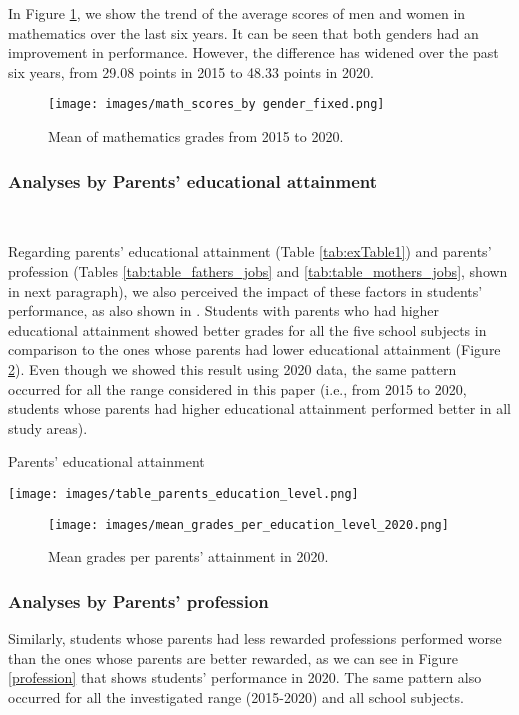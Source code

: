 \documentclass[12pt]{article}
\begin{document}
In Figure \ref{math_scores}, we show the trend of the average scores of men and women in mathematics over the last six years. It can be seen that both genders had an improvement in performance. However, the difference has widened over the past six years, from  29.08 points in 2015 to 48.33 points in 2020.

\begin{figure}[h!]
\centerline{\texttt{[image: images/math\_scores\_by gender\_fixed.png]}}
\caption{Mean of mathematics grades from 2015 to 2020.} 
\label{math_scores}
\end{figure}

\subsubsection{Analyses by Parents' educational attainment}\

Regarding parents' educational attainment (Table \ref{tab:exTable1}) and parents' profession (Tables \ref{tab:table_fathers_jobs} and \ref{tab:table_mothers_jobs}, shown in next paragraph), we also perceived the impact of these factors in students' performance, as also shown in \cite{Farooq2012FACTORSAS}. Students with parents who had higher educational attainment showed better grades for all the five school subjects in comparison to the ones whose parents had lower educational attainment (Figure \ref{education}). Even though we showed this result using 2020 data, the same pattern occurred for all the range considered in this paper (i.e., from 2015 to 2020, students whose parents had higher educational attainment performed better in all study areas).  


\begin{table}[ht]
\centering
\caption{Parents' educational attainment}
\label{tab:exTable1}
\texttt{[image: images/table\_parents\_education\_level.png]}
\end{table}


\begin{figure}[h!]
\centerline{\texttt{[image: images/mean\_grades\_per\_education\_level\_2020.png]}}
\caption{Mean grades per parents' attainment in 2020.} 
\label{education}
\end{figure}

\subsubsection{Analyses by Parents' profession}

Similarly, students whose parents had less rewarded professions performed worse than the ones whose parents are better rewarded, as we can see in Figure \ref{profession} that shows students' performance in 2020. The same pattern also occurred for all the investigated range (2015-2020) and all school subjects.  
\end{document}
